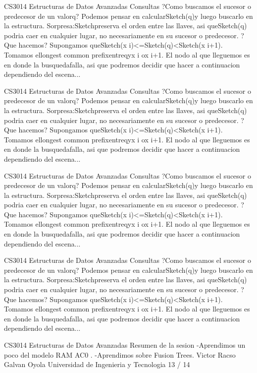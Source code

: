 \begin{description}[leftmargin=!,labelwidth=4.2em,style=nextline]
\item[Pag. 45] CS3014 Estructuras de Datos Avanzadas Consultas ?Como buscamos el sucesor o predecesor de un valorq? Podemos pensar en calcularSketch(q)y luego buscarlo en la estructura. Sorpresa:Sketchpreserva el orden entre las llaves, asi queSketch(q) podria caer en cualquier lugar, no necesariamente en su sucesor o predecesor. ?Que hacemos? Supongamos queSketch(x i)<=Sketch(q)<Sketch(x i+1). Tomamos ellongest common prefixentreqyx i ox i+1. El nodo al que lleguemos es en donde la busquedafalla, asi que podremos decidir que hacer a continuacion dependiendo del escena...
\item[Pag. 46] CS3014 Estructuras de Datos Avanzadas Consultas ?Como buscamos el sucesor o predecesor de un valorq? Podemos pensar en calcularSketch(q)y luego buscarlo en la estructura. Sorpresa:Sketchpreserva el orden entre las llaves, asi queSketch(q) podria caer en cualquier lugar, no necesariamente en su sucesor o predecesor. ?Que hacemos? Supongamos queSketch(x i)<=Sketch(q)<Sketch(x i+1). Tomamos ellongest common prefixentreqyx i ox i+1. El nodo al que lleguemos es en donde la busquedafalla, asi que podremos decidir que hacer a continuacion dependiendo del escena...
\item[Pag. 47] CS3014 Estructuras de Datos Avanzadas Consultas ?Como buscamos el sucesor o predecesor de un valorq? Podemos pensar en calcularSketch(q)y luego buscarlo en la estructura. Sorpresa:Sketchpreserva el orden entre las llaves, asi queSketch(q) podria caer en cualquier lugar, no necesariamente en su sucesor o predecesor. ?Que hacemos? Supongamos queSketch(x i)<=Sketch(q)<Sketch(x i+1). Tomamos ellongest common prefixentreqyx i ox i+1. El nodo al que lleguemos es en donde la busquedafalla, asi que podremos decidir que hacer a continuacion dependiendo del escena...
\item[Pag. 48] CS3014 Estructuras de Datos Avanzadas Consultas ?Como buscamos el sucesor o predecesor de un valorq? Podemos pensar en calcularSketch(q)y luego buscarlo en la estructura. Sorpresa:Sketchpreserva el orden entre las llaves, asi queSketch(q) podria caer en cualquier lugar, no necesariamente en su sucesor o predecesor. ?Que hacemos? Supongamos queSketch(x i)<=Sketch(q)<Sketch(x i+1). Tomamos ellongest common prefixentreqyx i ox i+1. El nodo al que lleguemos es en donde la busquedafalla, asi que podremos decidir que hacer a continuacion dependiendo del escena...
\item[Pag. 49] CS3014 Estructuras de Datos Avanzadas Resumen de la sesion -Aprendimos un poco del modelo RAM AC0 . -Aprendimos sobre Fusion Trees. Victor Racso Galvan Oyola Universidad de Ingenieria y Tecnologia 13 / 14

\end{description}
